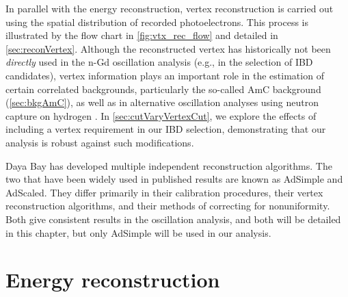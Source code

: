 \documentclass[../thesis.tex]{subfiles}
\begin{document}
In parallel with the energy reconstruction, vertex reconstruction is carried out using the spatial distribution of recorded photoelectrons. This process is illustrated by the flow chart in \autoref{fig:vtx_rec_flow} and detailed in \autoref{sec:reconVertex}. Although the reconstructed vertex has historically not been \emph{directly} used in the n-Gd oscillation analysis (e.g., in the selection of IBD candidates), vertex information plays an important role in the estimation of certain correlated backgrounds, particularly the so-called AmC background (\autoref{sec:bkgAmC}), as well as in alternative oscillation analyses using neutron capture on hydrogen \cite{new_nH_paper}. In \autoref{sec:cutVaryVertexCut}, we explore the effects of including a vertex requirement in our IBD selection, demonstrating that our analysis is robust against such modifications.

Daya Bay has developed multiple independent reconstruction algorithms. The two that have been widely used in published results are known as AdSimple and AdScaled. They differ primarily in their calibration procedures, their vertex reconstruction algorithms, and their methods of correcting for nonuniformity. Both give consistent results in the oscillation analysis, and both will be detailed in this chapter, but only AdSimple will be used in our analysis.

\section{Energy reconstruction}
\label{sec:reconEnergy}
\end{document}
